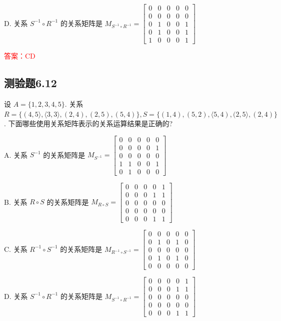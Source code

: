 \documentclass[UTF8, heading=true]{ctexart}
\begin{document}
D. 关系 $S^{-1} \circ R^{-1}$ 的关系矩阵是 $M_{S^{-1} \circ R^{-1}}=\left[\begin{array}{ccccc}0 & 0 & 0 & 0 & 0 \\ 0 & 0 & 0 & 0 & 0 \\ 0 & 1 & 0 & 0 & 1 \\ 0 & 1 & 0 & 0 & 1 \\ 1 & 0 & 0 & 0 & 1\end{array}\right]$

\textcolor{red}{答案：CD}

\subsection{测验题6.12}

设 $A=\{1,2,3,4,5\}$. 关系 $R=\{(4,5\rangle,\langle 3,3\rangle,(2,4),(2,5),(5,4)\}, S=\{(1,4),(5,2),\langle 5,4),(2,5\rangle,(2,4)\}$.
下面哪些使用关系矩阵表示的关系运算结果是正确的?

A. 关系 $S^{-1}$ 的关系矩阵是 $M_{S^{-1}}=\left[\begin{array}{ccccc}0 & 0 & 0 & 0 & 0 \\ 0 & 0 & 0 & 0 & 1 \\ 0 & 0 & 0 & 0 & 0 \\ 1 & 1 & 0 & 0 & 1 \\ 0 & 1 & 0 & 0 & 0\end{array}\right]$

B. 关系 $R \circ S$ 的关系矩阵是 $M_{R \circ S}=\left[\begin{array}{lllll}0 & 0 & 0 & 0 & 1 \\ 0 & 0 & 0 & 1 & 1 \\ 0 & 0 & 0 & 0 & 0 \\ 0 & 0 & 0 & 0 & 0 \\ 0 & 0 & 0 & 1 & 1\end{array}\right]$

C. 关系 $R^{-1} \circ S^{-1}$ 的关系矩阵是 $M_{R^{-1} \circ S^{-1}}=\left[\begin{array}{lllll}0 & 0 & 0 & 0 & 0 \\ 0 & 1 & 0 & 1 & 0 \\ 0 & 0 & 0 & 0 & 0 \\ 0 & 1 & 0 & 1 & 0 \\ 0 & 0 & 0 & 0 & 0\end{array}\right]$

D. 关系 $S^{-1} \circ R^{-1}$ 的关系矩阵是 $M_{S^{-1} \circ R^{-1}}=\left[\begin{array}{ccccc}0 & 0 & 0 & 0 & 1 \\ 0 & 0 & 0 & 1 & 1 \\ 0 & 0 & 0 & 0 & 0 \\ 0 & 0 & 0 & 0 & 0 \\ 0 & 0 & 0 & 1 & 1\end{array}\right]$
\end{document}
